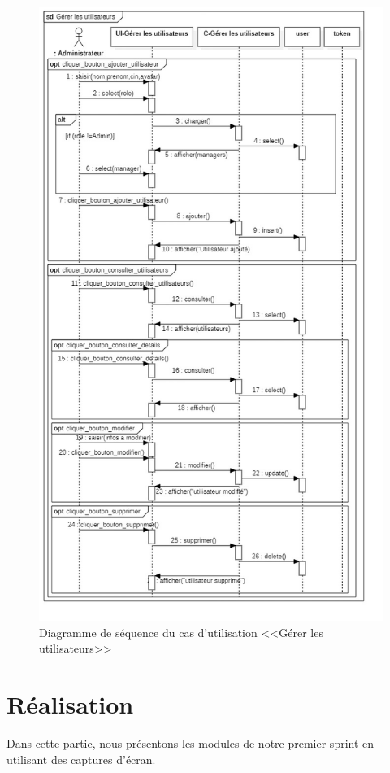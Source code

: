\begin{figure}[H]
     \centering
     \includegraphics[width=15cm]{images/S-gus.jpg}
     \vspace{-1cm}
     \caption{Diagramme de séquence du cas d'utilisation <<Gérer les utilisateurs>>}
     \label{fig:manage_userss_diagram}
\end{figure}
\section{Réalisation}
Dans cette partie, nous présentons les modules de notre premier sprint en utilisant des captures d’écran.
